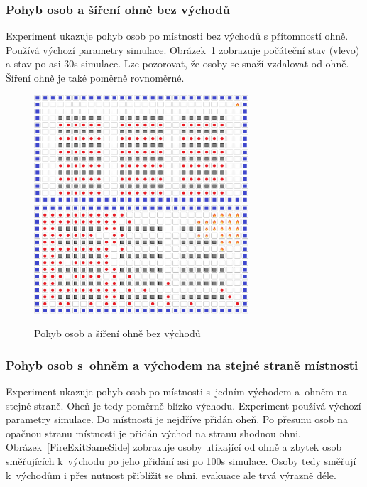 \documentclass[11pt, titlepage, a4paper]{article}
\begin{document}
        \subsubsection{Pohyb osob a šíření ohně bez východů}
        Experiment ukazuje pohyb osob po místnosti bez východů s přítomností ohně. Používá výchozí parametry simulace. Obrázek~\ref{noExit_oneFire} zobrazuje počáteční stav (vlevo) a stav po asi 30s simulace. Lze pozorovat, že osoby se snaží vzdalovat od ohně. Šíření ohně je také poměrně rovnoměrné.\\

        \begin{figure}[H]
            \includegraphics[width=8cm]{TestLayouts/fire_initial_state}
            \includegraphics[width=8cm]{TestLayouts/noExit_oneFire}
            \caption{Pohyb osob a šíření ohně bez východů}
            \label{noExit_oneFire}
        \end{figure}

        \subsubsection{Pohyb osob s~ohněm a východem na stejné straně místnosti}
        \label{exp_onefire_oneexit}
        Experiment ukazuje pohyb osob po místnosti s~jedním východem a~ohněm na stejné straně. Oheň je tedy poměrně blízko východu. Experiment používá výchozí parametry simulace. Do místnosti je nejdříve přidán oheň. Po přesunu osob na opačnou stranu místnosti je přidán východ na stranu shodnou ohni. Obrázek~\ref{FireExitSameSide} zobrazuje osoby utíkající od ohně a zbytek osob směřujících k~východu po jeho přidání asi po 100s simulace. Osoby tedy směřují k~východům i přes nutnost přiblížit se ohni, evakuace ale trvá výrazně déle.\\
\end{document}
